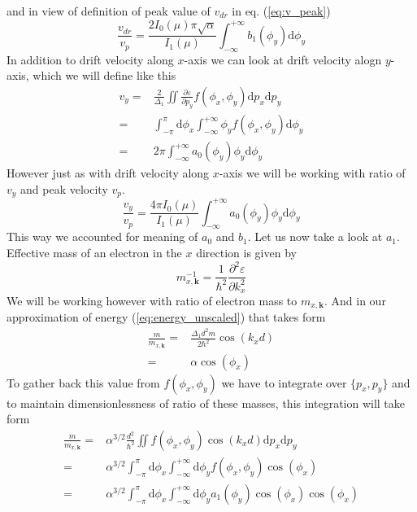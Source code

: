 \documentclass[40pt,letterpaper,physrev]{article}
\begin{document}
	and in view of definition of peak value of $v_{dr}$ in eq. (\ref{eq:v_peak})
	\begin{equation}
	\boxed{
		\frac{v_{dr}}{v_p}=\frac{2I_0(\mu)\pi\sqrt{\alpha}}{I_1(\mu)}
			\int^{+\infty}_{-\infty}b_1(\phi_y)\text{d}\phi_y
			}
	\end{equation}
	In addition to drift velocity along $x$-axis we can look at drift velocity alogn $y$-axis, which we will define like this
	\begin{align}
	v_y=&\frac{2}{\Delta_1}\iint\frac{\partial\varepsilon}{\partial p_y}f(\phi_x,\phi_y)\text{d}p_x\text{d}p_y \\
	=&\int^{\pi}_{-\pi}\text{d}\phi_x\int^{+\infty}_{-\infty} \phi_y f(\phi_x,\phi_y) \text{d}\phi_y \\
	=&2\pi\int^{+\infty}_{-\infty}a_0(\phi_y)\phi_y\text{d}\phi_y
	\end{align}
	However just as with drift velocity along $x$-axis we will be working with ratio of $v_y$ and peak velocity $v_p$.
	\begin{equation}
	\boxed{
	\frac{v_y}{v_p}=\frac{4\pi I_0(\mu)}{I_1(\mu)}\int^{+\infty}_{-\infty}a_0(\phi_y)\phi_y\text{d}\phi_y
	}
	\end{equation}
	This way we accounted for meaning of $a_0$ and $b_1$. Let us now take a look at $a_1$. Effective mass of an electron in the $x$ direction is given by 
	\begin{equation}
		m^{-1}_{x,\mathbf{k}}=\frac{1}{\hbar^2}\frac{\partial^2\varepsilon}{\partial k^2_x}
	\end{equation}
	We will be working however with ratio of electron mass to $m_{x,\mathbf{k}}$. And in our approximation of energy (\ref{eq:energy_unscaled}) that takes form
	\begin{align}
	\frac{m}{m_{x,\mathbf{k}}}=&\frac{\Delta_1 d^2m}{2\hbar^2}\cos(k_xd) \\
	=&\alpha\cos(\phi_x)
	\end{align}
	To gather back this value from $f(\phi_x,\phi_y)$ we have to integrate over $\{p_x,p_y\}$ and to maintain dimensionlessness of ratio of these masses, this integration will take form
	\begin{align}
	\frac{m}{m_{x,\mathbf{k}}}=&\alpha^{3/2}\frac{d^2}{\hbar^2}\iint f(\phi_x, \phi_y)\cos(k_{x}d)\text{d}p_x\text{d}p_y \\
	=&\alpha^{3/2}\int^{\pi}_{-\pi}\text{d}\phi_x\int^{+\infty}_{-\infty}\text{d}\phi_y f(\phi_x, \phi_y)\cos(\phi_x) \\
	=&\alpha^{3/2}\int^{\pi}_{-\pi}\text{d}\phi_x\int^{+\infty}_{-\infty}\text{d}\phi_y a_1(\phi_y)\cos(\phi_x)\cos(\phi_x)
	\end{align}
\end{document}
